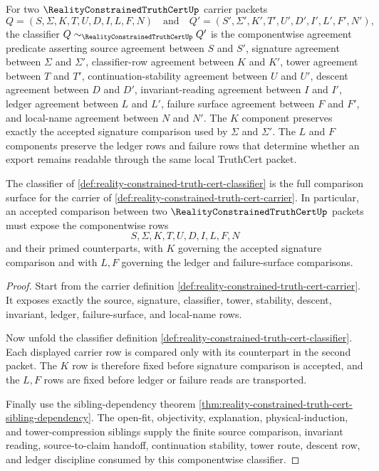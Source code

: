 \begin{definition}
\label{def:reality-constrained-truth-cert-classifier}
For two $\RealityConstrainedTruthCertUp$ carrier packets
$$
Q=(S,\Sigma,K,T,U,D,I,L,F,N)
\quad\text{and}\quad
Q'=(S',\Sigma',K',T',U',D',I',L',F',N'),
$$
the classifier $Q\sim_{\RealityConstrainedTruthCertUp}Q'$ is the componentwise
agreement predicate asserting source agreement between $S$ and $S'$, signature
agreement between $\Sigma$ and $\Sigma'$, classifier-row agreement between $K$
and $K'$, tower agreement between $T$ and $T'$, continuation-stability agreement
between $U$ and $U'$, descent agreement between $D$ and $D'$, invariant-reading
agreement between $I$ and $I'$, ledger agreement between $L$ and $L'$, failure
surface agreement between $F$ and $F'$, and local-name agreement between $N$ and
$N'$. The $K$ component preserves exactly the accepted signature comparison
used by $\Sigma$ and $\Sigma'$. The $L$ and $F$ components preserve the ledger
rows and failure rows that determine whether an export remains readable through
the same local TruthCert packet.
\end{definition}

\begin{theorem}
\label{thm:reality-constrained-truth-cert-classifier-obligation-surface}
The classifier of \autoref{def:reality-constrained-truth-cert-classifier}
is the full comparison surface for the carrier of
\autoref{def:reality-constrained-truth-cert-carrier}. In particular, an
accepted comparison between two $\RealityConstrainedTruthCertUp$ packets must
expose the componentwise rows
$$
S,\Sigma,K,T,U,D,I,L,F,N
$$
and their primed counterparts, with $K$ governing the accepted signature
comparison and with $L,F$ governing the ledger and failure-surface comparisons.
\end{theorem}
\begin{proof}
Start from the carrier definition
\autoref{def:reality-constrained-truth-cert-carrier}. It exposes exactly the
source, signature, classifier, tower, stability, descent, invariant, ledger,
failure-surface, and local-name rows.

Now unfold the classifier definition
\autoref{def:reality-constrained-truth-cert-classifier}. Each displayed carrier
row is compared only with its counterpart in the second packet. The $K$ row is
therefore fixed before signature comparison is accepted, and the $L,F$ rows are
fixed before ledger or failure reads are transported.

Finally use the sibling-dependency theorem
\autoref{thm:reality-constrained-truth-cert-sibling-dependency}. The open-fit,
objectivity, explanation, physical-induction, and tower-compression siblings
supply the finite source comparison, invariant reading, source-to-claim handoff,
continuation stability, tower route, descent row, and ledger discipline consumed
by this componentwise classifier.
\end{proof}

